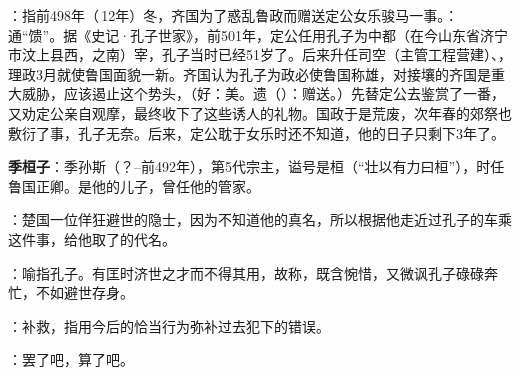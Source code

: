 {
\item {}：指前498年（\,12年）冬，齐国为了惑乱鲁政而赠送定公女乐骏马一事。：通“馈”。据《史记·孔子世家》，前501年，定公任用孔子为中都（在今山东省济宁市汶上县西，之南）宰，孔子当时已经51岁了。后来升任司空（主管工程营建）、，理政3月就使鲁国面貌一新。齐国认为孔子为政必使鲁国称雄，对接壤的齐国是重大威胁，应该遏止这个势头，（好：美。遗（）：赠送。）先替定公去鉴赏了一番，又劝定公亲自观摩，最终收下了这些诱人的礼物。国政于是荒废，次年春的郊祭也敷衍了事，孔子无奈。后来，定公耽于女乐时还不知道，他的日子只剩下3年了。%

\item {}\textbf{季桓子}：季孙斯（？--前492年），第5代宗主，谥号是桓（“壮以有力曰桓”），时任鲁国正卿。是他的儿子，曾任他的管家。
}
{}


{
\item {}：楚国一位佯狂避世的隐士，因为不知道他的真名，所以根据他走近过孔子的车乘这件事，给他取了的代名。
\item {}：喻指孔子。有匡时济世之才而不得其用，故称，既含惋惜，又微讽孔子碌碌奔忙，不如避世存身。%
\item {}：补救，指用今后的恰当行为弥补过去犯下的错误。
\item {}：罢了吧，算了吧。
}
{}


